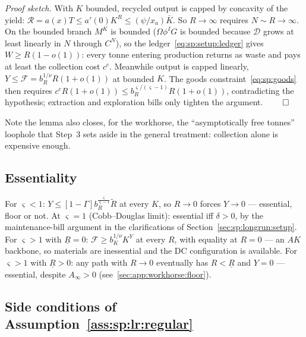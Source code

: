 \emph{Proof sketch.} With $K$ bounded, recycled output is capped by concavity of the yield:
$\mathcal R=a\!\left(x\right)T\le a'\!\left(0\right)K^R\le\left(\psi/x_a\right)\bar K$. So
$R\to\infty$ requires $N\sim R\to\infty$. On the bounded branch $M^K$ is bounded
($\Omega\phi^IG$ is bounded because $\mathcal D$ grows at least linearly in $N$ through
$C^N$), so the ledger~\eqref{eq:sp:setup:ledger} gives $W\ge R\left(1-o\left(1\right)\right)$:
every tonne entering production returns as waste and pays at least the collection cost $c^c$.
Meanwhile output is capped linearly,
$Y\le\mathcal F=b_R^{1/\nu}R\left(1+o\left(1\right)\right)$ at bounded $K$. The goods
constraint~\eqref{eq:sp:goods} then requires
$c^cR\left(1+o\left(1\right)\right)\le b_R^{\varsigma/\left(\varsigma-1\right)}R\left(1+o\left(1\right)\right)$,
contradicting the hypothesis; extraction and exploration bills only tighten the argument.
\hfill$\qed$

Note the lemma also closes, for the workhorse, the ``asymptotically free tonnes'' loophole
that Step~3 sets aside in the general treatment: collection alone is expensive enough.

\subsection{Essentiality}\label{sec:app:workhorse:essentiality}

For $\varsigma<1$: $Y\le\left[1-\Gamma\right]b_R^{\frac{\varsigma}{\varsigma-1}}\tilde R$ at
every $K$, so $R\to0$ forces $Y\to0$ --- essential, floor or not. At $\varsigma=1$
(Cobb--Douglas limit): essential iff $\delta>0$, by the maintenance-bill argument in the
clarifications of Section~\ref{sec:sp:longrun:setup}. For $\varsigma>1$ with
$\underline R=0$: $\mathcal F\ge b_K^{1/\nu}K^Y$ at every $R$, with equality at $R=0$ --- an
$AK$ backbone, so materials are inessential and the DC configuration is available. For
$\varsigma>1$ with $\underline R>0$: any path with $R\to0$ eventually has $R<\underline R$ and
$Y=0$ --- essential, despite $A_\infty>0$ (see~\ref{sec:app:workhorse:floor}).

\subsection{Side conditions of Assumption~\ref{ass:sp:lr:regular}}
\label{sec:app:workhorse:side}

